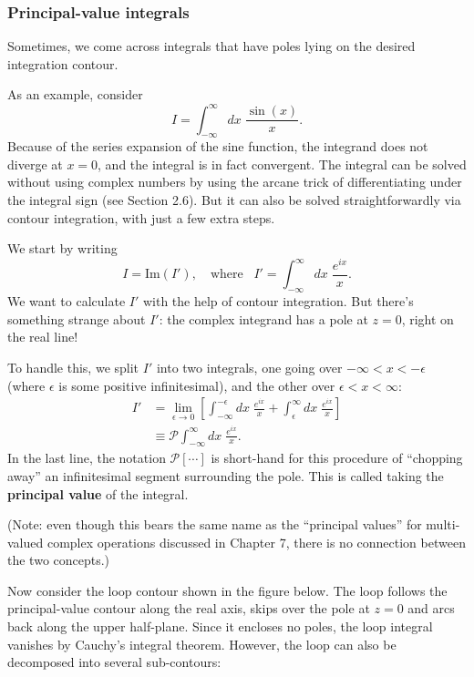 \documentclass[10pt,a4paper]{article}
\begin{document}
\subsubsection{Principal-value integrals}
\label{principal-value-integrals}

Sometimes, we come across integrals that have poles lying on the
desired integration contour.

As an example, consider
\begin{equation}
I = \int_{-\infty}^\infty dx\; \frac{\sin(x)}{x}.
\end{equation}
Because of the series expansion of the sine function, the integrand
does not diverge at $x = 0$, and the integral is in fact
convergent. The integral can be solved without using complex numbers
by using the arcane trick of differentiating under the integral sign
(see Section 2.6). But it can also be solved straightforwardly via
contour integration, with just a few extra steps.

We start by writing
\begin{equation}
I = \mathrm{Im}(I'), \quad \mathrm{where}\;\;\; I' = \int_{-\infty}^\infty dx\; \frac{e^{ix}}{x}.
\end{equation}
We want to calculate $I'$ with the help of contour integration. But
there's something strange about $I'$: the complex integrand has a pole
at $z = 0$, right on the real line!

To handle this, we split $I'$ into two integrals, one going over
$-\infty < x < -\epsilon$ (where $\epsilon$ is some positive
infinitesimal), and the other over $\epsilon < x < \infty$:
\begin{align}
  I' &= \lim_{\epsilon \rightarrow 0} \left[ \int_{-\infty}^{-\epsilon} dx\; \frac{e^{ix}}{x} + \int_{\epsilon}^\infty dx\; \frac{e^{ix}}{x}\right] \\
  &\equiv \mathcal{P} \int_{-\infty}^\infty dx\; \frac{e^{ix}}{x}.
\end{align}
In the last line, the notation $\mathcal{P}[\cdots]$ is short-hand for
this procedure of ``chopping away'' an infinitesimal segment
surrounding the pole. This is called taking the \textbf{principal
  value} of the integral.

(Note: even though this bears the same name as the ``principal
values'' for multi-valued complex operations discussed in Chapter 7,
there is no connection between the two concepts.)

Now consider the loop contour shown in the figure below. The loop
follows the principal-value contour along the real axis, skips over
the pole at $z = 0$ and arcs back along the upper half-plane.  Since
it encloses no poles, the loop integral vanishes by Cauchy's integral
theorem.  However, the loop can also be decomposed into several
sub-contours:
\end{document}

